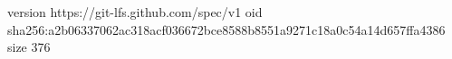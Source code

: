 version https://git-lfs.github.com/spec/v1
oid sha256:a2b06337062ac318acf036672bce8588b8551a9271c18a0c54a14d657ffa4386
size 376
